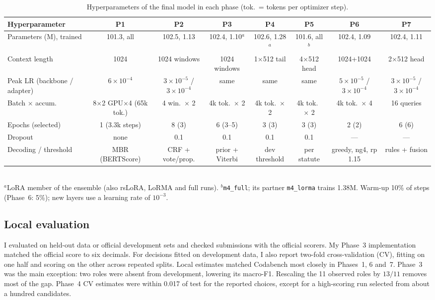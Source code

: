 \documentclass[11pt, oneside]{article}
\newcommand{\run}[1]{\texttt{#1}}
\begin{document}
\begin{table}[htbp]
\centering\small
\caption{Hyperparameters of the final model in each phase (tok.\ = tokens per optimizer step).}
\label{tab:hparams}
\begin{adjustbox}{max width=\textwidth}
\begin{tabular}{lccccccc}
\toprule
Hyperparameter & P1 & P2 & P3 & P4 & P5 & P6 & P7 \\
\midrule
Parameters (M), trained & 101.3, all & 102.5, 1.13 & 102.4, 1.10$^a$ & 102.6, 1.28$^a$ & 101.6, all$^b$ & 102.4, 1.09 & 102.4, 1.11\\
Context length & 1024 & 1024 windows & 1024 windows & 1$\times$512 tail & 4$\times$512 head & 1024+1024 & 2$\times$512 head\\
Peak LR (backbone / adapter) & $6\!\times\!10^{-4}$ & $3\!\times\!10^{-5}$ / $3\!\times\!10^{-4}$ & same & same & same & $5\!\times\!10^{-5}$ / $3\!\times\!10^{-4}$ & $3\!\times\!10^{-5}$ / $3\!\times\!10^{-4}$\\
Batch $\times$ accum. & 8$\times$2 GPU$\times$4 (65k tok.) & 4 win.\ $\times$ 2 & 4k tok.\ $\times$ 2 & 4k tok.\ $\times$ 2 & 4k tok.\ $\times$ 2 & 4k tok.\ $\times$ 4 & 16 queries\\
Epochs (selected) & 1 (3.3k steps) & 8 (3) & 6 (3--5) & 3 (3) & 3 (3) & 2 (2) & 6 (6)\\
Dropout & none & 0.1 & 0.1 & 0.1 & 0.1 & --- & ---\\
Decoding / threshold & MBR (BERTScore) & CRF + vote/prop. & prior + Viterbi & dev threshold & per statute & greedy, ng4, rp 1.15 & rules + fusion\\
\bottomrule
\end{tabular}
\end{adjustbox}
\\[1pt]{\footnotesize $^a$LoRA member of the ensemble (also rsLoRA, LoRMA and full runs). $^b$\run{m4\_full}; its partner
\run{m4\_lorma} trains 1.38M. Warm-up 10\% of steps (Phase~6: 5\%); new layers use a learning rate of $10^{-3}$.}
\end{table}

\subsection{Local evaluation}
I evaluated on held-out data or official development sets and checked submissions with the official scorers.
My Phase~3 implementation matched the official score to six decimals. For decisions fitted on development data,
I also report two-fold cross-validation (CV), fitting on one half and scoring on the other across repeated splits.
Local estimates matched Codabench most closely in Phases~1, 6 and~7. Phase~3 was the main exception: two roles
were absent from development, lowering its macro-F1. Rescaling the 11 observed roles by $13/11$ removes most of
the gap. Phase~4 CV estimates were within 0.017 of test for the reported choices, except for a high-scoring run
selected from about a hundred candidates.
\end{document}
